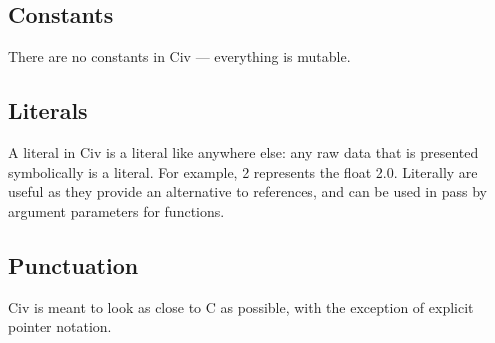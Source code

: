 \documentclass[a4paper]{article}
\begin{document}
\begin{multicols}{2}
\noindent 
{}
\end{multicols}


\subsection{Constants}

There are no constants in Civ — everything is mutable.

\subsection{Literals}

A literal in Civ is a literal like anywhere else: any raw data that is presented symbolically is a literal. For example, 2 represents the float 2.0. Literally are useful as they provide an alternative to references, and can be used in pass by argument parameters for functions.

\subsection{Punctuation}

Civ is meant to look as close to C as possible, with the exception of explicit pointer notation.
\end{document}
